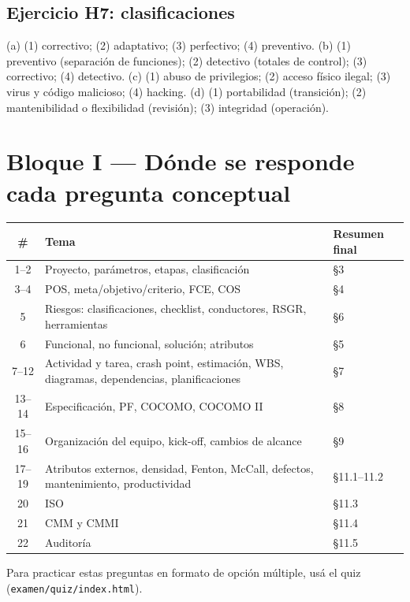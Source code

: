 \documentclass[11pt,a4paper]{article}
\begin{document}
\subsection*{Ejercicio H7: clasificaciones}
(a) (1) correctivo; (2) adaptativo; (3) perfectivo; (4) preventivo. (b) (1) preventivo (separación de funciones);
(2) detectivo (totales de control); (3) correctivo; (4) detectivo. (c) (1) abuso de privilegios; (2) acceso físico
ilegal; (3) virus y código malicioso; (4) hacking. (d) (1) portabilidad (transición); (2) mantenibilidad o
flexibilidad (revisión); (3) integridad (operación).

\section{Bloque I --- Dónde se responde cada pregunta conceptual}
\begin{center}\small
\begin{tabularx}{\textwidth}{@{}c X l@{}}
\toprule
\# & Tema & Resumen final\\
\midrule
1--2 & Proyecto, parámetros, etapas, clasificación & §3\\
3--4 & POS, meta/objetivo/criterio, FCE, COS & §4\\
5 & Riesgos: clasificaciones, checklist, conductores, RSGR, herramientas & §6\\
6 & Funcional, no funcional, solución; atributos & §5\\
7--12 & Actividad y tarea, crash point, estimación, WBS, diagramas, dependencias, planificaciones & §7\\
13--14 & Especificación, PF, COCOMO, COCOMO II & §8\\
15--16 & Organización del equipo, kick-off, cambios de alcance & §9\\
17--19 & Atributos externos, densidad, Fenton, McCall, defectos, mantenimiento, productividad & §11.1--11.2\\
20 & ISO & §11.3\\
21 & CMM y CMMI & §11.4\\
22 & Auditoría & §11.5\\
\bottomrule
\end{tabularx}
\end{center}
Para practicar estas preguntas en formato de opción múltiple, usá el quiz (\texttt{examen/quiz/index.html}).
\end{document}
